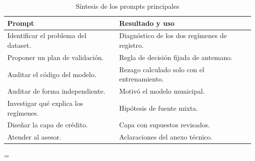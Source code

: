 \documentclass[conference,letterpaper]{IEEEtran}
\begin{document}
\begin{table}[!b]
\centering
\caption{Síntesis de los prompts principales}
\label{tab:ia}
\fontsize{6.5}{7.5}\selectfont\renewcommand{\arraystretch}{1.1}
\begin{tabular}{@{}>{\raggedright\arraybackslash}p{3.6cm}>{\raggedright\arraybackslash}p{4.6cm}@{}}
\toprule
Prompt & Resultado y uso \\
\midrule
Identificar el problema del dataset. & Diagnóstico de los dos regímenes de registro. \\
Proponer un plan de validación. & Regla de decisión fijada de antemano. \\
Auditar el código del modelo. & Rezago calculado solo con el entrenamiento. \\
Auditar de forma independiente. & Motivó el modelo municipal. \\
Investigar qué explica los regímenes. & Hipótesis de fuente mixta. \\
Diseñar la capa de crédito. & Capa con supuestos revisados. \\
Atender al asesor. & Aclaraciones del anexo técnico. \\
\bottomrule
\end{tabular}
\end{table}



=\vbox{}
\end{document}
